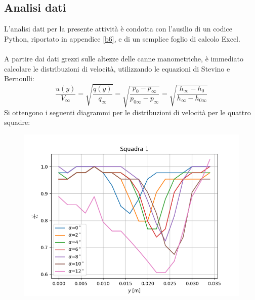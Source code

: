 \subsection{Analisi dati}
L'analisi dati per la presente attività è condotta con l'ausilio di un codice Python, riportato in appendice \ref{b6}, e di un semplice foglio di calcolo Excel.\\\\
A partire dai dati grezzi sulle altezze delle canne manometriche, è immediato calcolare le distribuzioni di velocità, utilizzando le equazioni di Stevino e Bernoulli:
\begin{equation*}
    \frac{u(y)}{V_\infty} = \sqrt{\frac{q(y)}{q_\infty}} =  \sqrt{\frac{p_0 - p_\infty}{p_{0\infty} - p_\infty}} = \sqrt{\frac{h_\infty - h_0}{h_{\infty} - h_{0\infty}}} 
\end{equation*}
Si ottengono i seguenti diagrammi per le distribuzioni di velocità per le quattro squadre:
\begin{figure}[H]
    \centering
    \includegraphics[width=.8\textwidth]{images/6/v1.png}
\end{figure}
